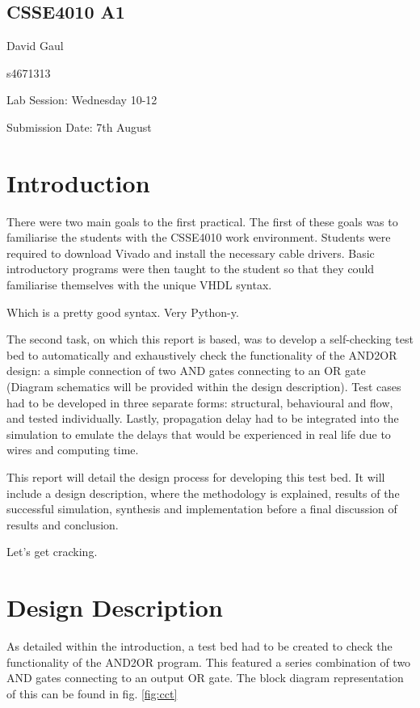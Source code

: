 \documentclass[12pt,a4paper]{article}
\begin{document}
\begin{center}
\bigskip
\section*{CSSE4010 A1}
\end{center}

David Gaul

s4671313

Lab Session: Wednesday 10-12

Submission Date: 7th August

\section{Introduction}

There were two main goals to the first practical. The first of these goals was to familiarise the students with the CSSE4010 work environment. Students were required to download Vivado and install the necessary cable drivers. Basic introductory programs were then taught to the student so that they could familiarise themselves with the unique VHDL syntax.

Which is a pretty good syntax. Very Python-y.

The second task, on which this report is based, was to develop a self-checking test bed to automatically and exhaustively check the functionality of the AND2OR design: a simple connection of two AND gates connecting to an OR gate (Diagram schematics will be provided within the design description). Test cases had to be developed in three separate forms: structural, behavioural and flow, and tested individually. Lastly, propagation delay had to be integrated into the simulation to emulate the delays that would be experienced in real life due to wires and computing time.

This report will detail the design process for developing this test bed. It will include a design description, where the methodology is explained, results of the successful simulation, synthesis and implementation before a final discussion of results and conclusion. 

Let's get cracking.

\section{Design Description}

As detailed within the introduction, a test bed had to be created to check the functionality of the AND2OR program. This featured a series combination of two AND gates connecting to an output OR gate. The block diagram representation of this can be found in fig. \ref{fig:cct}
\end{document}
